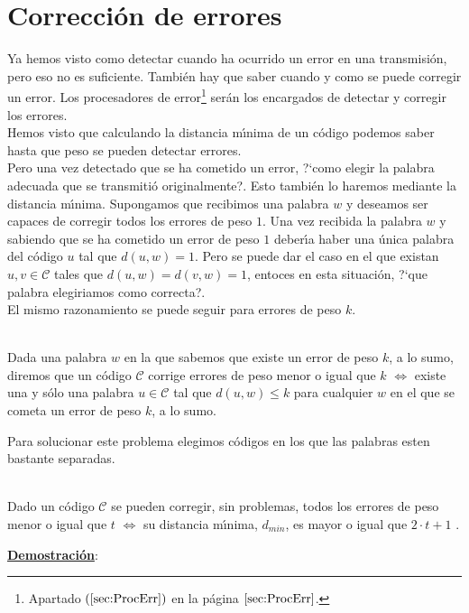 %
%

\section{Correcci\'on de errores}

Ya hemos visto como detectar cuando ha ocurrido un error en una transmisi\'on,
pero eso no es suficiente. Tambi\'en hay que saber cuando y como se puede
corregir un error. Los procesadores de error\footnote{Apartado
$(\ref{sec:ProcErr})$ en la p\'agina $\pageref{sec:ProcErr}$.} ser\'an los
encargados de detectar y corregir los errores.\\

Hemos visto que calculando la distancia m\'{\i}nima de un c\'odigo podemos
saber hasta que peso se pueden detectar errores.\\

Pero una vez detectado que se ha cometido un error, ?`como elegir la palabra
adecuada que se transmiti\'o originalmente?. Esto tambi\'en lo haremos mediante
la distancia m\'{\i}nima.
%
\newpage
%
Supongamos que recibimos una palabra $w$ y deseamos ser capaces de corregir
todos los errores de peso $1$. Una vez recibida la palabra $w$ y sabiendo que
se ha cometido un error de peso $1$ deber\'{\i}a haber una \'unica palabra
del c\'odigo $u$ tal que $d(u,w)=1$. Pero se puede dar el caso en el que existan
$u,v\in \mathcal{C}$ tales que $d(u,w)=d(v,w)=1$, entoces en esta situaci\'on,
?`que palabra elegiriamos como correcta?.\\

El mismo razonamiento se puede seguir para errores de peso $k$.
\begin{definicion}
\ \\
Dada una palabra $w$ en la que sabemos que existe un error de peso $k$, a lo
sumo, diremos que un c\'odigo $\mathcal{C}$ corrige errores de peso menor o
igual que $k$ $\Longleftrightarrow$ existe una y s\'olo una palabra $u\in
\mathcal{C}$ tal que $d(u,w)\leq k$ para cualquier $w$ en el que se cometa un
error de peso $k$, a lo sumo.
\end{definicion}

Para solucionar este problema elegimos c\'odigos en los que las palabras esten
bastante separadas.

\begin{teorema}\label{the:Correccion}
\ \\
Dado un c\'odigo $\mathcal{C}$ se pueden corregir, sin problemas, todos los
errores de peso menor o igual que $t$ $\Longleftrightarrow$ su distancia
m\'{\i}nima, $d_{min}$, es mayor o igual que $2\cdot t +1$ .
\end{teorema}
\underline{\textbf{Demostraci\'on}}:

